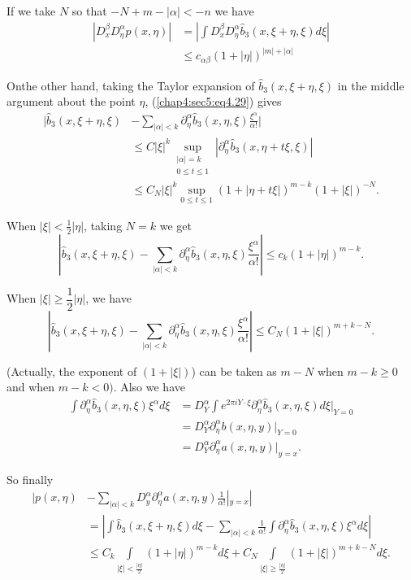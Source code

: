 If we take $N$ so that $-N+m -|\alpha| <-n$ we have
\begin{align*}
  |D^\beta _x D^ \alpha _ \eta p (x, \eta)| & = |\int D^\beta _x D^ \alpha
  _ \eta \hat{b}_3 (x, \xi+ \eta,  \xi) d \xi|
  \tag{4.30}\label{chap4:sec5:eq4.30} \\
  & \leq c_{\alpha \beta}(1+|\eta|)^{|m|+|\alpha|}
\end{align*}
 
 On\pageoriginale the other hand, taking the Taylor expansion of
 $\hat{b}_3 (x, \xi  + \eta,  \xi)$ in the middle argument about the
 point $\eta$, (\ref{chap4:sec5:eq4.29}) gives  
\begin{align*}
  |\hat{b}_3 (x, \xi + \eta, \xi) & - \sum_{|\alpha|< k} \partial
  ^{\alpha}_\eta \hat{b}_3 (x, \eta, \xi) \frac {\xi ^\alpha}{\alpha
    !}| \\
 & \le C|\xi|^k \sup_{\substack {|\alpha|=k \\{0 \le t \le 1}}}
  |\partial ^\alpha _ \eta \hat{b}_3 (x, \eta + t \xi,  \xi)|\\ 
  &  \le C_N |\xi|^k  \sup_{0 \le t \le 1} (1+|\eta +t
  \xi|)^{m-k}(1+|\xi|)^{-N}. 
\end{align*}

When $|\xi| <\frac{1}{2} |\eta|$, taking $N=k$ we get
$$
|\hat{b}_3 (x, \xi + \eta, \xi)- \sum_{|\alpha|< k} \partial ^ \alpha_
\eta \hat{b}_3 (x, \eta,  \xi) \frac{\xi^\alpha}{\alpha !}| \le c_k
(1+|\eta|)^{m-k}. 
$$

When $|\xi| \ge \dfrac{1}{2}|\eta|$, we have
$$
|\hat{b}_3 (x, \xi +\eta, \xi)- \sum_{|\alpha|< k} \partial ^{\alpha}_
\eta \hat{b}_3 (x, \eta, \xi) \frac {\xi^\alpha}{\alpha !}|\le C_N
(1+|\xi|)^{m+k-N}.  
$$

(Actually, the exponent of $(1+|\xi|)$) can be taken as $m-N$ when
$m-k \ge 0$ and when $m-k < 0)$. Also we have 
\begin{align*}
  \int \partial^\alpha_\eta \hat{b}_3 (x, \eta, \xi) \xi^\alpha d \xi
  &= D^\alpha_Y \int e^{2 \pi i Y \cdot \xi} \partial^\alpha_\eta
  \hat{b}_3 (x,\eta, \xi)d \xi |_{Y=0}\\ 
  &= D^\alpha_Y \partial^\alpha_ \eta b(x, \eta, y)|_{Y=0}\\
  &= D^\alpha_Y \partial^\alpha_\eta a(x, \eta, y)| _{y=x}.
\end{align*}

So finally
\begin{align*}
  |p(x, \eta) & - \sum _{|\alpha| <k} D^ \alpha _y \partial ^ \alpha _ \eta
  a (x, \eta, y) \frac {1}{\alpha !}|_{y=x}| \\
  &= |\int \hat{b}_3 (x, \xi + \eta,  \xi) d \xi -\sum_{|\alpha|< k}
  \frac {1}{\alpha !} \int \partial ^ \alpha _ \eta \hat{b}_3 (x, \eta
  , \xi) \xi^{\alpha}d \xi| \\ 
  & \le C_k \int \limits_{|\xi|< \frac {|\eta|}{2}} (1+ |\eta|)^{m-k} d
  \xi+ C_N \int \limits _{|\xi| \ge \frac{|\eta|}{2}} (1+
  |\xi|)^{m+k-N} d \xi. 
\end{align*}

